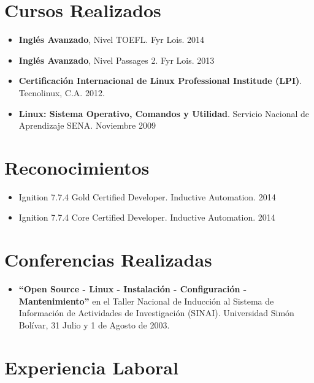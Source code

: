 \documentclass[letterpaper,11pt]{report}
\begin{document}
\section*{Cursos Realizados}
\begin{itemize}
\item \textbf{Inglés Avanzado}, Nivel TOEFL. Fyr Lois. 2014
\item \textbf{Inglés Avanzado}, Nivel Passages 2. Fyr Lois. 2013 
\item \textbf{Certificación Internacional de Linux Professional Institude (LPI)}. Tecnolinux, C.A. 2012.
\item \textbf{Linux: Sistema Operativo, Comandos y Utilidad}. Servicio Nacional de Aprendizaje SENA. Noviembre 2009
\end{itemize}

\section*{Reconocimientos}
\begin{itemize}
    \item Ignition 7.7.4 Gold Certified Developer. Inductive Automation. 2014
    \item Ignition 7.7.4 Core Certified Developer. Inductive Automation. 2014
\end{itemize}

\section*{Conferencias Realizadas}
\begin{itemize}
\item
\textbf{``Open Source - Linux - Instalación - Configuración - Mantenimiento''} en el Taller Nacional de Inducción al Sistema de Información de Actividades de Investigación (SINAI). Universidad Simón Bolívar, 31 Julio y 1 de Agosto de 2003.
\end{itemize}

\section*{Experiencia Laboral}
\end{document}
